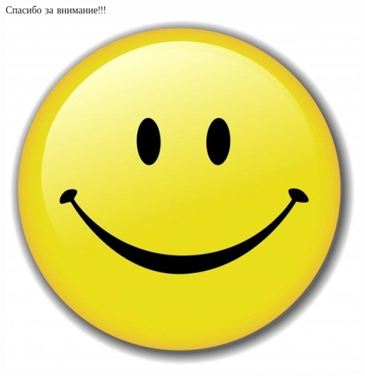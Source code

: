 \documentclass[11pt]{beamer}
\begin{document}
\begin{frame}{}
\begin{center}
	\huge Спасибо за внимание!!!
	\includegraphics[scale=0.5]{../pics/smile.jpg}
\end{center}				
\end{frame}
\end{document}
